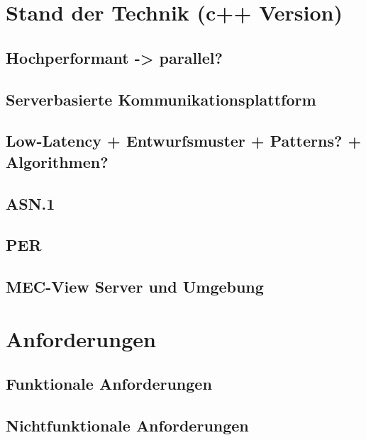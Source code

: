 \documentclass[
	12pt,
	table,
	bigheadings,
	ngerman,
	a4paper,
	BCOR5mm,
	DIV14,
	1.1headlines,
	pagesize,
	oneside,
	openright,
	titlepage,
	headsepline,
	nochapterprefix,
	bibtotoc,
	tocindent,
	listsindent,
	pointlessnumbers,
	cleardoubleempty,
	fleqn,
	halfparskip
]{scrbook}
\begin{document}
	
	
	
	
	
	
	
	\thispagestyle{empty}
	
	\setcounter{page}{0}
	
	\clearpage	
	\hypersetup{allcolors=black}
	\tableofcontents
	\hypersetup{allcolors=blue}
	\newpage
	
	
	\setcounter{page}{1}
	
	
	

	
	\chapter{Stand der Technik (c++ Version)}
		\section{Hochperformant -> parallel?}
		\section{Serverbasierte Kommunikationsplattform}
		\section{Low-Latency + Entwurfsmuster + Patterns? + Algorithmen?}
		\section{ASN.1}
		\section{PER}
		\section{MEC-View Server und Umgebung}
		
	
	\chapter{Anforderungen}
		\section{Funktionale Anforderungen}
		\section{Nichtfunktionale Anforderungen}
\end{document}
